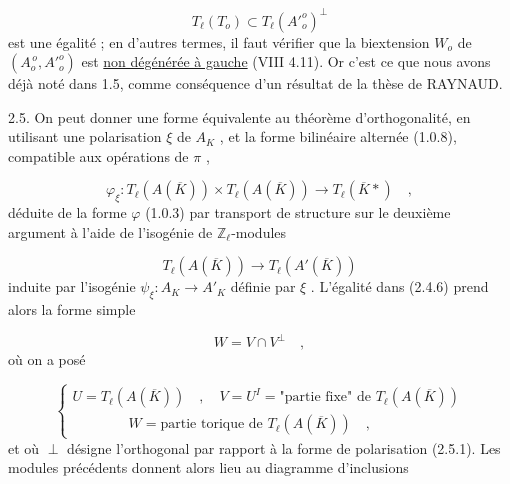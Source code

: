 \begin{equation}\tag{2.4.7}
T_{\ell}(T_{o}) \subset T_{\ell}({A'}^{o}_{o})^{\perp}
\end{equation}
est une égalité ; en d'autres termes, il faut vérifier que la biextension $W_{o}$ de $(A_{o}^{\,o},{A'}^{o}_{o})$ est \underline{non dégénérée à gauche} (VIII 4.11). Or c'est ce que nous avons déjà noté dans 1.5, comme conséquence d'un résultat de la thèse de RAYNAUD.

2.5.  On peut donner une forme équivalente au théorème d'orthogonalité, en utilisant une polarisation $\xi$ de $A_{K}$ , et la forme bilinéaire alternée (1.0.8), compatible aux opérations de $\pi$ ,

\begin{equation}\tag{2.5.1}
\varphi_{\xi} : T_{\ell}(A(\overline{K})) \times T_{\ell}(A(\overline{K})) \longrightarrow T_{\ell}(\overline{K}*) \quad ,
\end{equation}
déduite de la forme $\varphi$ (1.0.3) par transport de structure sur le deuxième argument à l'aide de l'isogénie de $\mathbb{Z}_{\ell}$-modules

\begin{equation*}
T_{\ell}(A(\overline{K})) \longrightarrow T_{\ell}(A'(\overline{K}))
\end{equation*}
induite par l'isogénie $\psi_{\xi} : A_{K} \longrightarrow A'_{K}$ définie par $\xi$ . L'égalité dans (2.4.6) prend alors la forme simple



\begin{equation}\tag{2.5.2}
W = V \cap V^{\perp} \quad ,
\end{equation}
où on a posé

\begin{equation}\tag{2.5.3}
\left\{
\begin{array}{l}
U = T_{\ell}(A(\overline{K})) \quad , \quad V = U^{I} = \text{"partie fixe" de } T_{\ell}(A(\overline{K})) \\[3mm]
\hspace{4em} W = \text{partie torique de } T_{\ell}(A(\overline{K})) \quad ,
\end{array}
\right.
\end{equation}
et où $\perp$ désigne l'orthogonal par rapport à la forme de polarisation (2.5.1). Les modules précédents donnent alors lieu au diagramme d'inclusions

